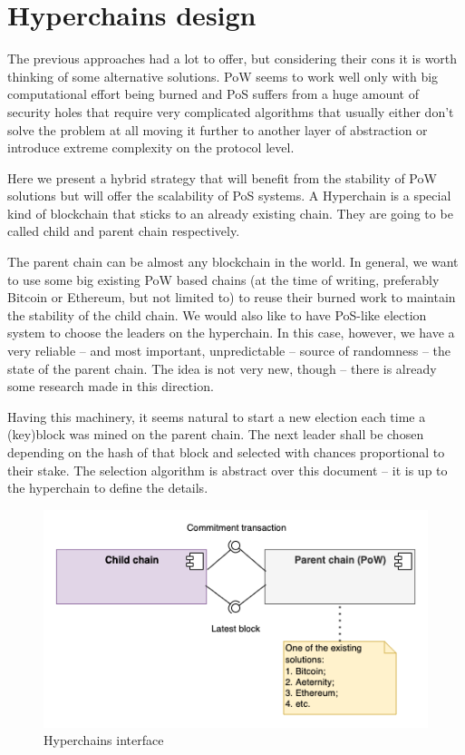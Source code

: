 \section{Hyperchains design}
\graphicspath{ {./images/} }

The previous approaches had a lot to offer, but considering their cons it is worth
thinking of some alternative solutions. PoW seems to work well only with big
computational effort being burned and PoS suffers from a huge amount of security
holes that require very complicated algorithms that usually either don't solve
the problem at all moving it further to another layer of abstraction or introduce
extreme complexity on the protocol level.

Here we present a hybrid strategy that will benefit from the stability of PoW
solutions but will offer the scalability of PoS systems. A Hyperchain is a
special kind of blockchain that sticks to an already existing chain. They are
going to be called child and parent chain respectively\cite{hyperchains}.

The parent chain can be almost any blockchain in the world. In general, we want
to use some big existing PoW based chains (at the time of writing, preferably
Bitcoin or Ethereum, but not limited to) to reuse their burned work to maintain
the stability of the child chain. We would also like to have
PoS-like election system to choose the leaders on the hyperchain. In this case,
however, we have a very reliable – and most important, unpredictable – source
of randomness – the state of the parent chain. The idea is not very new,
though – there is already some research made in this direction\cite{blockchain_random}.

Having this machinery, it seems natural to start a new election each time a
(key)block was mined on the parent chain. The next leader shall be chosen
depending on the hash of that block and selected with chances proportional to
their stake. The selection algorithm is abstract over this document – it is
up to the hyperchain to define the details.

\begin{figure}[b]
     \caption{Hyperchains interface}
     \centering
     \includegraphics[scale=0.5]{hyperchains_interface}
\end{figure}

